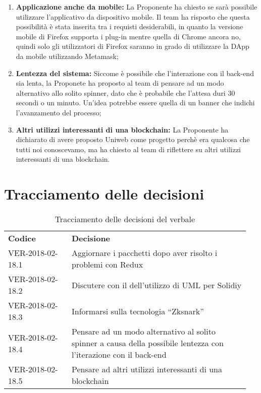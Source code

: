 \documentclass[VER-2018-01-09.tex]{subfiles}
\begin{document}
\begin{enumerate}
	\item \textbf{Applicazione anche da mobile:} La Proponente ha chiesto se sarà possibile utilizzare l'applicativo da dispositivo mobile. Il team ha risposto che questa possibilità è stata inserita tra i requisti desiderabili, in quanto la versione mobile di Firefox supporta i plug-in mentre quella di Chrome ancora no, quindi solo gli utilizzatori di Firefox saranno in grado di utilizzare la DApp da mobile utilizzando Metamask;
	\item \textbf{Lentezza del sistema:} Siccome è possibile che l'interazione con il back-end sia lenta, la Proponete ha proposto al team di pensare ad un modo alternativo allo solito spinner, dato che è probabile che l'attesa duri 30 secondi o un minuto. Un'idea potrebbe essere quella di un banner che indichi l'avanzamento del processo;
	\item \textbf{Altri utilizzi interessanti di una blockchain:} La Proponente ha dichiarato di avere proposto Uniweb come progetto perchè era qualcosa che tutti noi conoscevamo, ma ha chiesto al team di riflettere su altri utilizzi interessanti di una blockchain.
\end{enumerate}

\section{Tracciamento delle decisioni}
\begin{table}[H]
	\begin{center}
		\begin{tabu} to 
			\tableHeaderStyle
			\textbf{Codice} & \textbf{Decisione} \\
			VER-2018-02-18.1 & Aggiornare i pacchetti dopo aver risolto i problemi con Redux \\
			VER-2018-02-18.2 & Discutere con il \Vardanega dell'utilizzo di UML per Solidiy \\
			VER-2018-02-18.3 & Informarsi sulla tecnologia \textquotedblleft Zksnark\textquotedblright \\
			VER-2018-02-18.4 & Pensare ad un modo alternativo al solito spinner a causa della possibile lentezza con l'iterazione con il back-end \\
			VER-2018-02-18.5 & Pensare ad altri utilizzi interessanti di una blockchain \\
		\end{tabu}
	\caption{Tracciamento delle decisioni del verbale}
	\end{center}
\end{table}
\end{document}
